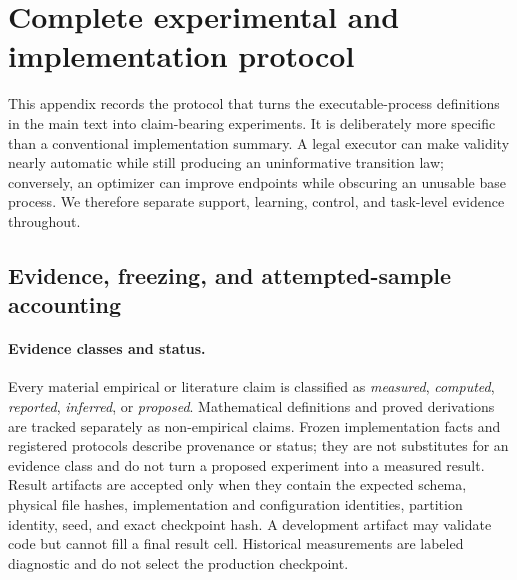\section{Complete experimental and implementation protocol}
\label{app:experimental-protocol}

This appendix records the protocol that turns the executable-process
definitions in the main text into claim-bearing experiments.  It is deliberately
more specific than a conventional implementation summary.  A legal executor
can make validity nearly automatic while still producing an uninformative
transition law; conversely, an optimizer can improve endpoints while obscuring
an unusable base process.  We therefore separate support, learning, control,
and task-level evidence throughout.

\subsection{Evidence, freezing, and attempted-sample accounting}
\label{app:evidence-freeze}

\paragraph{Evidence classes and status.}
Every material empirical or literature claim is classified as
\emph{measured}, \emph{computed}, \emph{reported}, \emph{inferred}, or
\emph{proposed}. Mathematical definitions and proved derivations are tracked
separately as non-empirical claims. Frozen implementation facts and registered
protocols describe provenance or status; they are not substitutes for an
evidence class and do not turn a proposed experiment into a measured result.
Result artifacts are accepted only when they contain the expected schema,
physical file hashes, implementation and configuration identities, partition
identity, seed, and exact checkpoint hash. A development artifact may validate
code but cannot fill a final result cell. Historical measurements are labeled
diagnostic and do not select the production checkpoint.

